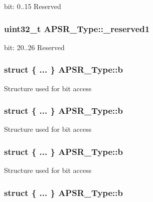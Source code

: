 bit\-: 0..15 Reserved \hypertarget{union_a_p_s_r___type_ac681f266e20b3b3591b961e13633ae13}{
\subsubsection[{\-\_\-reserved1}]{\setlength{\rightskip}{0pt plus 5cm}uint32\-\_\-t A\-P\-S\-R\-\_\-\-Type\-::\-\_\-reserved1}}\label{union_a_p_s_r___type_ac681f266e20b3b3591b961e13633ae13}
bit\-: 20..26 Reserved \hypertarget{union_a_p_s_r___type_a7dbc79a057ded4b11ca5323fc2d5ab14}{
\subsubsection[{b}]{\setlength{\rightskip}{0pt plus 5cm}struct \{ ... \}   A\-P\-S\-R\-\_\-\-Type\-::b}}\label{union_a_p_s_r___type_a7dbc79a057ded4b11ca5323fc2d5ab14}
Structure used for bit access \hypertarget{union_a_p_s_r___type_aa3870151dd04a5398c73a3327f7644a9}{
\subsubsection[{b}]{\setlength{\rightskip}{0pt plus 5cm}struct \{ ... \}   A\-P\-S\-R\-\_\-\-Type\-::b}}\label{union_a_p_s_r___type_aa3870151dd04a5398c73a3327f7644a9}
Structure used for bit access \hypertarget{union_a_p_s_r___type_af5f6237182ed81f50fd9cf7669c9a581}{
\subsubsection[{b}]{\setlength{\rightskip}{0pt plus 5cm}struct \{ ... \}   A\-P\-S\-R\-\_\-\-Type\-::b}}\label{union_a_p_s_r___type_af5f6237182ed81f50fd9cf7669c9a581}
Structure used for bit access \hypertarget{union_a_p_s_r___type_a9d6e85a85f395a3b51e915420fe081de}{
\subsubsection[{b}]{\setlength{\rightskip}{0pt plus 5cm}struct \{ ... \}   A\-P\-S\-R\-\_\-\-Type\-::b}}\label{union_a_p_s_r___type_a9d6e85a85f395a3b51e915420fe081de}
